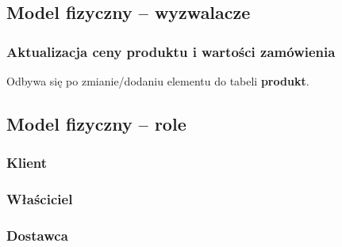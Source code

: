 \subsection{Model fizyczny -- wyzwalacze}
\subsubsection{Aktualizacja ceny produktu i wartości zamówienia}
\label{prTrig}
Odbywa się po zmianie/dodaniu elementu do tabeli \textbf{produkt}.

\subsection{Model fizyczny -- role}
\subsubsection{Klient}

\subsubsection{Właściciel}

\subsubsection{Dostawca}


